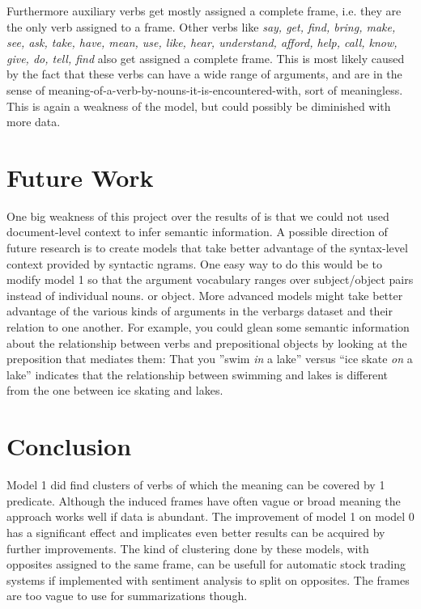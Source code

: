 \documentclass{article} %
\begin{document}
Furthermore auxiliary verbs get mostly assigned a complete frame, i.e. they are the only verb assigned to a frame. Other verbs like \textit{say, get, find, bring, make, see, ask, take, have, mean, use, like, hear, understand, afford, help, call, know, give, do, tell, find} also get assigned a complete frame. This is most likely caused by the fact that these verbs can have a wide range of arguments, and are in the sense of meaning-of-a-verb-by-nouns-it-is-encountered-with, sort of meaningless. This is again a weakness of the model, but could possibly be diminished with more data.   

\section{Future Work}
One big weakness of this project over the results of \citet{oconnor2013} is that 
we could not used document-level context to infer semantic information.
A possible direction of future research is to create models that take better 
advantage of the syntax-level context provided by syntactic ngrams. 
One easy way to do this would be to modify model 1 so that the argument 
vocabulary ranges over subject/object pairs instead of individual nouns.
or object.
More advanced models might take better advantage of the various kinds of arguments
in the verbargs dataset and their relation to one another.
For example, you could glean some semantic information about the relationship between
verbs and prepositional objects by looking at the preposition that mediates them: 
That you ''swim \emph{in} a lake'' versus ``ice skate \emph{on} a lake'' 
indicates that the relationship between swimming and lakes is different from the one between
ice skating and lakes.

\section{Conclusion}
Model 1 did find clusters of verbs of which the meaning can be covered by 1 predicate. Although the induced frames have often vague or broad meaning the approach works well if data is abundant. The improvement of model 1 on model 0 has a significant effect and implicates even better results can be acquired by further improvements. The kind of clustering done by these models, with opposites assigned to the same frame, can be usefull for automatic stock trading systems if implemented with sentiment analysis to split on opposites. The frames are too vague to use for summarizations though.
\end{document}
